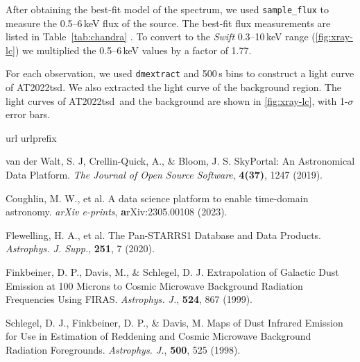 \documentclass{nature_plusfigure}
\newcommand{\apj}{{Astrophys. J.}}
\newcommand{\apjs}{{Astrophys. J. Supp.}}
\newcommand{\at}{AT2022tsd}
\begin{document}
\begin{methods}
After obtaining the best-fit model of the spectrum, we used \texttt{sample\_flux} to measure the 0.5--6\,keV flux of the source. The best-fit flux measurements are listed in Table~\ref{tab:chandra} . To convert to the \emph{Swift} 0.3--10\,keV range (\ref{fig:xray-lc}) we multiplied the 0.5--6\,keV values by a factor of 1.77.

For each observation, we used \texttt{dmextract} and 500\,s bins to construct a light curve of \at. We also extracted the light curve of the background region. The light curves of \at\ and the background are shown in \ref{fig:xray-lc}, with 1-$\sigma$ error bars.

\vspace{1in}
%
%

\begin{thebibliography}{10}
\expandafter\ifx\csname url\endcsname\relax
  \def\url#1{\texttt{#1}}\fi
\expandafter\ifx\csname urlprefix\endcsname\relax\def\urlprefix{URL }\fi
\providecommand{\bibinfo}[2]{#2}
\providecommand{\eprint}[2][]{\url{#2}}
\makeatletter
\addtocounter{\@listctr}{74}
\makeatother



  van der Walt, S. J, Crellin-Quick, A., \& Bloom, J. S. SkyPortal: An Astronomical Data Platform. \emph{The Journal of Open Source Software}, \textbf{4(37)}, 1247 (2019). 

  Coughlin, M. W., et al. A data science platform to enable time-domain astronomy. \emph{arXiv e-prints}, \textbf arXiv:2305.00108 (2023). 


  Flewelling, H. A., et al. The Pan-STARRS1 Database and Data Products. \emph{\apjs}, \textbf{251}, 7 (2020). 

  Finkbeiner, D. P., Davis, M., \& Schlegel, D. J. Extrapolation of Galactic Dust Emission at 100 Microns to Cosmic Microwave Background Radiation Frequencies Using FIRAS. \emph{\apj}, \textbf{524}, 867 (1999). 
 
  Schlegel, D. J., Finkbeiner, D. P., \& Davis, M. Maps of Dust Infrared Emission for Use in Estimation of Reddening and Cosmic Microwave Background Radiation Foregrounds. \emph{\apj}, \textbf{500}, 525 (1998). 


\end{thebibliography}
\end{methods}
\end{document}
